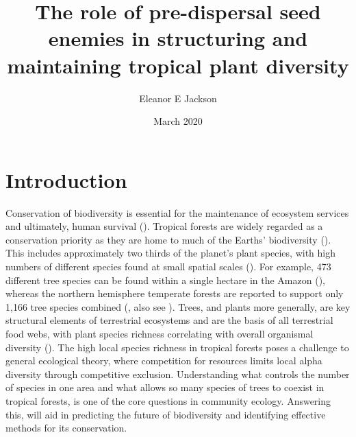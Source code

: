 \documentclass[12pt,a4]{RDGThesis}
\title{The role of pre-dispersal seed enemies in structuring and maintaining tropical plant diversity}
\author{Eleanor E Jackson}
\date{March 2020}
\begin{document}
\rdgtitlepage
\setcounter{secnumdepth}{3} \setcounter{tocdepth}{3}

\doublespacing
\setlength{\headheight}{15.2pt}
\pagestyle{fancy}

\section{Introduction}

Conservation of biodiversity is essential for the maintenance of ecosystem services and ultimately, human survival (\cite{randsBiodiversityConservationChallenges2010, chanConservationPlanningEcosystem2006}). Tropical forests are widely regarded as a conservation priority as they are home to much of the Earths’ biodiversity (\cite{brooksGlobalBiodiversityConservation2006}). This includes approximately two thirds of the planet’s plant species, with high numbers of different species found at small spatial scales (\cite{wilsonBiodiversity1988}). For example, 473 different tree species can be found within a single hectare in the Amazon (\cite{valenciaHighTreeAlphadiversity1994, deoliveiraCentralAmazonianTerra1999}), whereas the northern hemisphere temperate forests are reported to support only 1,166 tree species combined (\cite{lathamContinentalComparisonsTemperatezone1993}, also see \cite{rickettsWhoWhereNorth1999, glenn-lewinSpeciesDiversityNorth1977}). Trees, and plants more generally, are key structural elements of terrestrial ecosystems and are the basis of all terrestrial food webs, with plant species richness correlating with overall organismal diversity (\cite{saubererSurrogateTaxaBiodiversity2004, duelliSearchBestCorrelates1998}). The high local species richness in tropical forests poses a challenge to general ecological theory, where competition for resources limits local alpha diversity through competitive exclusion. Understanding what controls the number of species in one area and what allows so many species of trees to coexist in tropical forests, is one of the core questions in community ecology. Answering this, will aid in predicting the future of biodiversity and identifying effective methods for its conservation. \\
\end{document}
